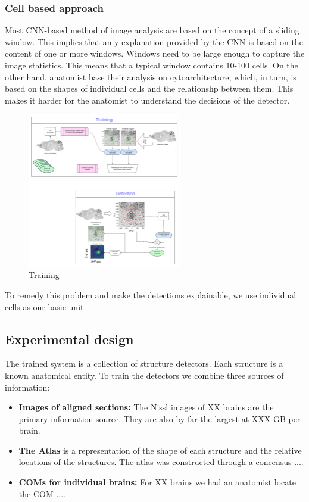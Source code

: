 \documentclass[runningheads]{llncs}
\begin{document}
\subsubsection{Cell based approach}  Most CNN-based method of image
analysis are based on the concept of a sliding window. This implies
that an
y explanation provided by the CNN is based on the content of one or more windows. Windows need to be large enough to capture the image statistics. This means that a typical window contains 10-100 cells.
On the other hand, anatomist base their analysis on cytoarchitecture, which, in turn, is based on the shapes of individual cells and the relationshp between them. This makes it harder for the anatomist to understand the decisions of the detector.
\begin{figure}
  \centering
  \includegraphics[width=0.6\textwidth]{figures/Training.pdf}
  \caption{Training \label{fig:training}}
\end{figure}

To remedy this problem and make the detections explainable, we use individual cells as our basic unit. 

\subsection{Experimental design}
The trained system is a collection of structure detectors. Each structure is a known anatomical entity. To train the detectors we combine three sources of information:
\begin{itemize}
    \item {\bf Images of aligned sections:} The Nissl images of XX brains are the primary information source. They are also by far the largest at XXX GB per brain.
    \item {\bf The Atlas} is a representation of the shape of each structure and the relative locations of the structures. The atlas was constructed through a concensus ....
    \item {\bf COMs for individual brains:} For XX brains we had an anatomist locate the COM ....
\end{itemize}
\end{document}
